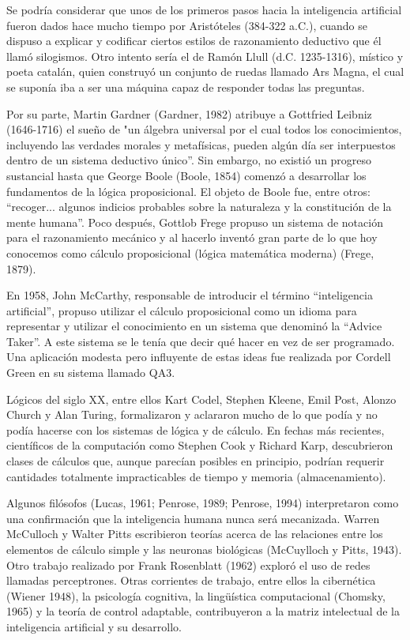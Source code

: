 Se podría considerar que unos de los primeros pasos hacia la inteligencia artificial fueron dados hace mucho tiempo por Aristóteles (384-322 a.C.), cuando se dispuso a explicar y codificar ciertos estilos de razonamiento deductivo que él llamó silogismos. Otro intento sería el de Ramón Llull (d.C. 1235-1316), místico y poeta catalán, quien construyó un conjunto de ruedas llamado Ars Magna, el cual se suponía iba a ser una máquina capaz de responder todas las preguntas.

Por su parte, Martin Gardner (Gardner, 1982) atribuye a Gottfried Leibniz (1646-1716) el sueño de "un álgebra universal por el cual todos los conocimientos, incluyendo las verdades morales y metafísicas, pueden algún día ser interpuestos dentro de un sistema deductivo único”. Sin embargo, no existió un progreso sustancial hasta que George Boole (Boole, 1854) comenzó a desarrollar los fundamentos de la lógica proposicional. El objeto de Boole fue, entre otros: “recoger... algunos indicios probables sobre la naturaleza y la constitución de la mente humana”. Poco después, Gottlob Frege propuso un sistema de notación para el razonamiento mecánico y al hacerlo inventó gran parte de lo que hoy conocemos como cálculo proposicional (lógica matemática moderna) (Frege, 1879).

En 1958, John McCarthy, responsable de introducir el término “inteligencia artificial”, propuso utilizar el cálculo proposicional como un idioma para representar y utilizar el conocimiento en un sistema que denominó la “Advice Taker”. A este sistema se le tenía que decir qué hacer en vez de ser programado. Una aplicación modesta pero influyente de estas ideas fue realizada por Cordell Green en su sistema llamado QA3.

Lógicos del siglo XX, entre ellos Kart Codel, Stephen Kleene, Emil Post, Alonzo Church y Alan Turing, formalizaron y aclararon mucho de lo que podía y no podía hacerse con los sistemas de lógica y de cálculo. En fechas más recientes, científicos de la computación como Stephen Cook y Richard Karp, descubrieron clases de cálculos que, aunque parecían posibles en principio, podrían requerir cantidades totalmente impracticables de tiempo y memoria (almacenamiento).

Algunos filósofos (Lucas, 1961; Penrose, 1989; Penrose, 1994) interpretaron como una confirmación que la inteligencia humana nunca será mecanizada. Warren McCulloch y Walter Pitts escribieron teorías acerca de las relaciones entre los elementos de cálculo simple y las neuronas biológicas (McCuylloch y Pitts, 1943). Otro trabajo realizado por Frank Rosenblatt (1962) exploró el uso de redes llamadas perceptrones. Otras corrientes de trabajo, entre ellos la cibernética (Wiener 1948), la psicología cognitiva, la lingüística computacional (Chomsky, 1965) y la teoría de control adaptable, contribuyeron a la matriz intelectual de la inteligencia artificial y su desarrollo.


